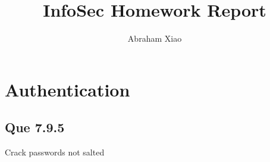 \documentclass{article}
\begin{document}
\title{InfoSec Homework Report}
\author{Abraham Xiao}
\maketitle

\section{Authentication}
\label{sec:authentication}

\subsection{Que 7.9.5}
\label{sec:que-7.9.5}
\begin{algorithm}
  \caption{Crack passwords not salted}
\label{sec:que-7.9.5-2:algo:crack-passwords-1}
\begin{algorithmic}
  
\end{algorithmic}
\end{algorithm}
\end{document}
